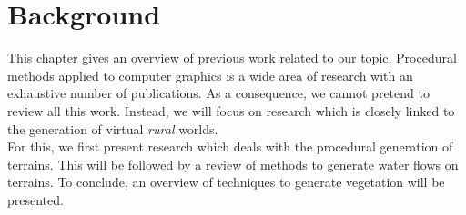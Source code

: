 
\chapter{Background}

This chapter gives an overview of previous work related to our topic. Procedural methods applied to computer graphics is a wide area of research with an exhaustive number of publications. As a consequence, we cannot pretend to review all this work. Instead, we will focus on research which is closely linked to the generation of virtual \textit{rural} worlds. \\

For this, we first present research which deals with the procedural generation of terrains. This will be followed by a review of methods to generate water flows on terrains. To conclude, an overview of techniques to generate vegetation will be presented.